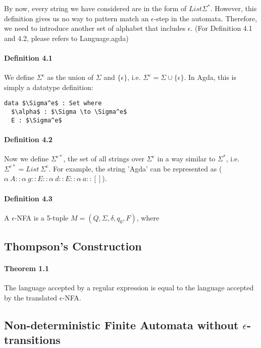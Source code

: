 \documentclass[twoside,openright,final]{bhamthesis}
\begin{document}
\par By now, every string we have considered are in the form of \(List
\Sigma^*\). However, this definition gives us no way to pattern match
an \(\epsilon\)-step in the automata. Therefore, we need to introduce another
set of alphabet that includes \(\epsilon\). (For Definition 4.1 and
4.2, please refers to Language.agda)

\paragraph{Definition 4.1} We define \(\Sigma^e\) as the union of
\(\Sigma\) and \(\{\epsilon\}\), i.e. \(\Sigma^e = \Sigma \cup
\{\epsilon\}\). In Agda, this is simply a datatype definition:
\begin{lstlisting}[mathescape=true,xleftmargin=.4\textwidth,aboveskip=0pt,belowskip=0pt]
data $\Sigma^e$ : Set where
  $\alpha$ : $\Sigma \to \Sigma^e$
  E : $\Sigma^e$
\end{lstlisting}

\paragraph{Definition 4.2} Now we define \(\Sigma^{e*}\), the set of all strings over
\(\Sigma^e\) in a way similar to \(\Sigma^*\), i.e. \(\Sigma^{e*} =
List\ \Sigma^e\). For example, the string 'Agda' can be
represented as (\(\alpha\ A :: \alpha\ g :: E :: \alpha\ d :: E :: \alpha\
a :: []\)). 

\paragraph{Definition 4.3} A \(\epsilon\)-NFA is a 5-tuple \(M = (Q ,
\Sigma, \delta, q_0, F)\), where

\subsection{Thompson's Construction}

\paragraph{Theorem 1.1} The language accepted by a regular expression
is equal to the language accepted by the translated \(\epsilon\)-NFA. 

\subsection{Non-deterministic Finite Automata without \(\epsilon\)-transitions}
\end{document}
